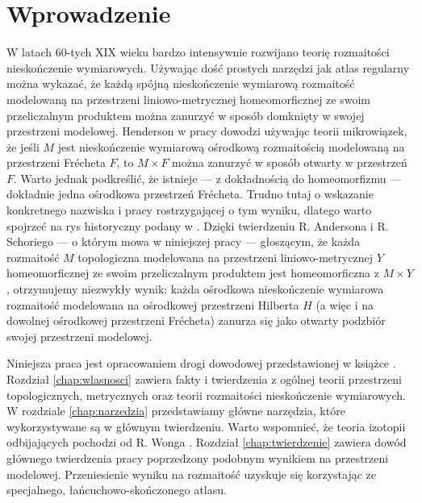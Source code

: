 \section{Wprowadzenie}
W latach 60-tych XIX wieku bardzo intensywnie rozwijano teorię rozmaitości nieskończenie wymiarowych. Używając dość prostych narzędzi jak atlas regularny można wykazać, że każdą spójną nieskończenie wymiarową rozmaitość modelowaną na przestrzeni liniowo-metrycznej homeomorficznej ze swoim przeliczalnym produktem można zanurzyć w sposób domknięty w swojej przestrzeni modelowej. Henderson w pracy \cite{hen} dowodzi używając teorii mikrowiązek, że jeśli $M$ jest nieskończenie wymiarową ośrodkową rozmaitością modelowaną na przestrzeni Frécheta $F$, to $M\times F$ można zanurzyć w sposób otwarty w przestrzeń $F$. Warto jednak podkreślić, że istnieje --- z dokładnością do homeomorfizmu --- dokładnie jedna ośrodkowa przestrzeń Frécheta. Trudno tutaj o wskazanie konkretnego nazwiska i pracy rostrzygającej o tym wyniku, dlatego warto spojrzeć na rys historyczny podany w \cite{bp}. Dzięki twierdzeniu R. Andersona i R. Schoriego --- o którym mowa w niniejszej pracy --- głoszącym, że każda rozmaitość $M$ topologiczna modelowana na przestrzeni liniowo-metrycznej $Y$ homeomorficznej ze swoim przeliczalnym produktem jest homeomorficzna z $M\times Y$, otrzymujemy niezwykły wynik: każda ośrodkowa nieskończenie wymiarowa rozmaitość modelowana na ośrodkowej przestrzeni Hilberta $H$ (a więc i na dowolnej ośrodkowej przestrzeni Frécheta) zanurza się jako otwarty podzbiór swojej przestrzeni modelowej.

Niniejsza praca jest opracowaniem drogi dowodowej przedstawionej w książce \cite{bp}. Rozdział \ref{chap:wlasnosci} zawiera fakty i twierdzenia z ogólnej teorii przestrzeni topologicznych, metrycznych oraz teorii rozmaitości nieskończenie wymiarowych. W rozdziale \ref{chap:narzedzia} przedstawiamy główne narzędzia, które wykorzystywane są w głównym twierdzeniu. Warto wspomnieć, że teoria izotopii odbijających pochodzi od R. Wonga \cite{won}. Rozdział \ref{chap:twierdzenie} zawiera dowód głównego twierdzenia pracy poprzedzony podobnym wynikiem na przestrzeni modelowej. Przeniesienie wyniku na rozmaitość uzyskuje się korzystając ze specjalnego, łańcuchowo-skończonego atlasu.